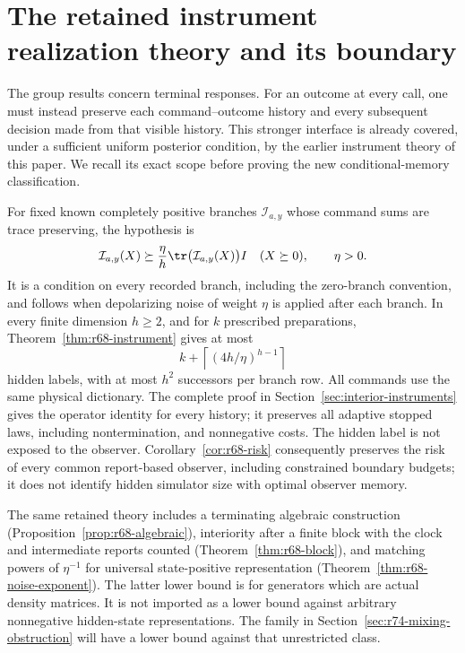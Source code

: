 \section{The retained instrument realization theory and its boundary}
\label{sec:r74-instruments}

The group results concern terminal responses. For an outcome at every call,
one must instead preserve each command--outcome history and every subsequent
decision made from that visible history. This stronger interface is already
covered, under a sufficient uniform posterior condition, by the earlier
instrument theory of this paper. We recall its exact scope before proving
the new conditional-memory classification.

For fixed known completely positive branches $\mathcal I_{a,y}$ whose
command sums are trace preserving, the hypothesis is
\[
 \mathcal I_{a,y}(X)\succeq
   \frac\eta h\tr\bigl(\mathcal I_{a,y}(X)\bigr)I
 \quad(X\succeq0),\qquad \eta>0.
\]
It is a condition on every recorded branch, including the zero-branch
convention, and follows when depolarizing noise of weight $\eta$ is applied
after each branch. In every finite dimension $h\ge2$, and for $k$ prescribed
preparations, Theorem~\ref{thm:r68-instrument} gives at most
\[
 k+\left\lceil(4h/\eta)^{h-1}\right\rceil
\]
hidden labels, with at most $h^2$ successors per branch row. All commands use
the same physical dictionary. The complete proof in
Section~\ref{sec:interior-instruments} gives the operator identity for every
history; it preserves all adaptive stopped laws, including nontermination,
and nonnegative costs. The hidden label is not exposed to the observer.
Corollary~\ref{cor:r68-risk} consequently preserves the risk of every common
report-based observer, including constrained boundary budgets; it does not
identify hidden simulator size with optimal observer memory.

The same retained theory includes a terminating algebraic construction
(Proposition~\ref{prop:r68-algebraic}), interiority after a finite block with
the clock and intermediate reports counted (Theorem~\ref{thm:r68-block}),
and matching powers of $\eta^{-1}$ for universal state-positive
representation (Theorem~\ref{thm:r68-noise-exponent}). The latter lower bound
is for generators which are actual density matrices. It is not imported
as a lower bound against arbitrary nonnegative hidden-state representations.
The family in Section~\ref{sec:r74-mixing-obstruction} will have a lower
bound against that unrestricted class.

